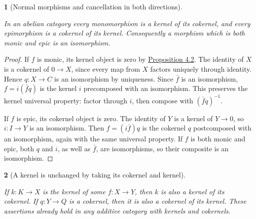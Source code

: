 \documentclass[11pt,a4paper]{article}
\newcommand{\mathheading}{}
\theoremstyle{plain}
\newtheorem*{plainstatement}{\mathheading}
\theoremstyle{definition}
\newenvironment{mathstatement}[3]{\renewcommand{\mathheading}{#1 #2}\begin{plainstatement}[#3]}{\end{plainstatement}}
\begin{document}
\begin{mathstatement}{Proposition}{4.5}{Normal morphisms and cancellation in both directions}
\label{env-4-5}

In an abelian category every monomorphism is a kernel of its cokernel, and every epimorphism is a cokernel of its kernel. Consequently a morphism which is both monic and epic is an isomorphism.


\par{}\par

\end{mathstatement}
 
\begin{proof}

If \(f\) is monic, its kernel object is zero by \hyperref[env-4-2]{Proposition 4.2}. The identity of \(X\) is a cokernel of \(0\to X\), since every map from \(X\) factors uniquely through identity. Hence \(q:X\to C\) is an isomorphism by uniqueness. Since \(\bar f\) is an isomorphism, \(f=i(\bar f q)\) is the kernel \(i\) precomposed with an isomorphism. This preserves the kernel universal property: factor through \(i\), then compose with \((\bar f q)^{-1}\).


If \(f\) is epic, its cokernel object is zero. The identity of \(Y\) is a kernel of \(Y\to0\), so \(i:I\to Y\) is an isomorphism. Then \(f=(i\bar f)q\) is the cokernel \(q\) postcomposed with an isomorphism, again with the same universal property. If \(f\) is both monic and epic, both \(q\) and \(i\), as well as \(\bar f\), are isomorphisms, so their composite is an isomorphism.


\end{proof}
 
\begin{mathstatement}{Proposition}{4.6}{A kernel is unchanged by taking its cokernel and kernel}
\label{env-4-6}

If \(k:K\to X\) is the kernel of some \(f:X\to Y\), then \(k\) is also a kernel of its cokernel. If \(q:Y\to Q\) is a cokernel, then it is also a cokernel of its kernel. These assertions already hold in any additive category with kernels and cokernels.


\par{}\par

\end{mathstatement}
 
\end{document}
